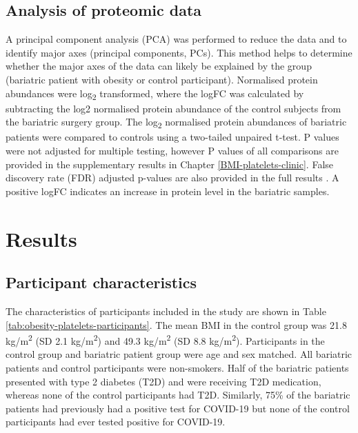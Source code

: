 \documentclass[11pt,twoside]{bristolthesis}
\begin{document}
\hypertarget{analysis-of-proteomic-data}{%
\subsection{Analysis of proteomic data}\label{analysis-of-proteomic-data}}

A principal component analysis (PCA) was performed to reduce the data and to identify major axes (principal components, PCs). This method helps to determine whether the major axes of the data can likely be explained by the group (bariatric patient with obesity or control participant). Normalised protein abundances were log\textsubscript{2} transformed, where the logFC was calculated by subtracting the log2 normalised protein abundance of the control subjects from the bariatric surgery group. The log\textsubscript{2} normalised protein abundances of bariatric patients were compared to controls using a two-tailed unpaired t-test. P values were not adjusted for multiple testing, however P values of all comparisons are provided in the supplementary results in Chapter \ref{BMI-platelets-clinic}. False discovery rate (FDR) adjusted p-values are also provided in the full results . A positive logFC indicates an increase in protein level in the bariatric samples.

\hypertarget{results-1}{%
\section{Results}\label{results-1}}

\hypertarget{participant-characteristics}{%
\subsection{Participant characteristics}\label{participant-characteristics}}

The characteristics of participants included in the study are shown in Table \ref{tab:obesity-platelets-participants}. The mean BMI in the control group was 21.8 kg/m\textsuperscript{2} (SD 2.1 kg/m\textsuperscript{2}) and 49.3 kg/m\textsuperscript{2} (SD 8.8 kg/m\textsuperscript{2}). Participants in the control group and bariatric patient group were age and sex matched. All bariatric patients and control participants were non-smokers. Half of the bariatric patients presented with type 2 diabetes (T2D) and were receiving T2D medication, whereas none of the control participants had T2D. Similarly, 75\% of the bariatric patients had previously had a positive test for COVID-19 but none of the control participants had ever tested positive for COVID-19.
\end{document}
